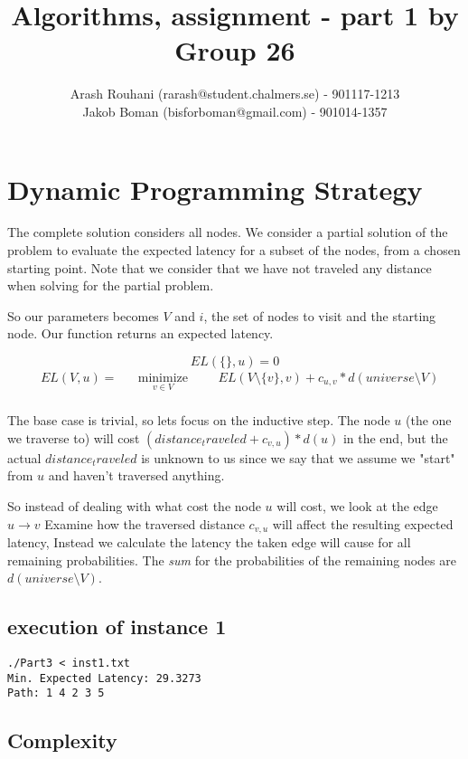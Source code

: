 \documentclass[a4paper,11pt]{article}
\title{Algorithms, assignment - part 1 by Group 26}
\author{Arash Rouhani (rarash@student.chalmers.se) - 901117-1213\\
        Jakob Boman (bisforboman@gmail.com) - 901014-1357}
\begin{document}
\maketitle

\section{Dynamic Programming Strategy}
The complete solution considers all nodes. We consider a partial solution
of the problem to evaluate the expected latency for a subset of the nodes,
from a chosen starting point. Note that we consider that we have not
traveled any distance when solving for the partial problem.

So our parameters becomes $V$ and $i$, the set of nodes to visit and the
starting node. Our function returns an expected latency.

$$ EL(\{\}, u) = 0 $$
\begin{equation*}
\begin{aligned}
& EL(V, u) =
& & \underset{v \in V}{\text{minimize}}
& & & EL(V\setminus \{v\}, v) + c_{u,v} * d(universe\setminus V) \\
\end{aligned}
\end{equation*}

The base case is trivial, so lets focus on the inductive step.
The node $u$ (the one we traverse to) will cost
$(distance_traveled+c_{v,u})*d(u)$ in the end, but the actual
$distance_traveled$ is unknown to us since we say that we assume
we "start" from $u$ and haven't traversed anything.

So instead of dealing with what cost the node $u$ will cost, we look at the
edge $u \to v$ Examine how the traversed distance $c_{v,u}$ will affect the
resulting expected latency, Instead we calculate the latency the taken edge will cause
for all remaining probabilities.
The \emph{sum} for the probabilities of the remaining nodes are
$d(universe\setminus V)$.

\subsection{execution of instance 1}

\begin{lstlisting}
./Part3 < inst1.txt
Min. Expected Latency: 29.3273
Path: 1 4 2 3 5
\end{lstlisting}

\subsection{Complexity}
\end{document}
